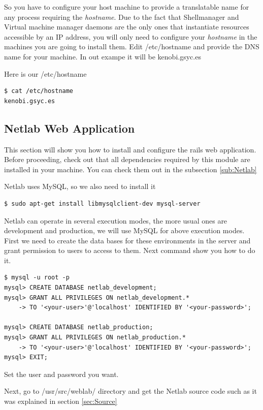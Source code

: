 \documentclass{article}
\begin{document}
So you have to configure your host machine to provide a translatable name for any process requiring the \textit{hostname}. Due to the fact that Shellmanager and Virtual machine manager daemons are the only ones that instantiate resources accessible by an IP address, you will only need to configure your \textit{hostname} in the machines you are going to install them. Edit /etc/hostname and provide the DNS name for your machine. In out exampe it will be kenobi.gsyc.es

Here is our /etc/hostname
\begin{verbatim}
$ cat /etc/hostname 
kenobi.gsyc.es
\end{verbatim}

\subsection{Netlab Web Application}
\label{sub:NetlabCFG}
This section will show you how to install and configure the rails web application. Before proceeding, check out that all dependencies required by this module are installed in your machine. You can check them out in the subsection \ref{sub:Netlab}

Netlab uses MySQL, so we also need to install it
\begin{verbatim}
$ sudo apt-get install libmysqlclient-dev mysql-server
\end{verbatim}

Netlab can operate in several execution modes, the more usual ones are development and production, we will use MySQL for above execution modes. First we need to create the data bases for these environments in the server and grant permission to users to access to them. Next command show you how to do it.

\begin{verbatim}
$ mysql -u root -p
mysql> CREATE DATABASE netlab_development;
mysql> GRANT ALL PRIVILEGES ON netlab_development.*
    -> TO '<your-user>'@'localhost' IDENTIFIED BY '<your-password>';

mysql> CREATE DATABASE netlab_production;
mysql> GRANT ALL PRIVILEGES ON netlab_production.*
    -> TO '<your-user>'@'localhost' IDENTIFIED BY '<your-password>';
mysql> EXIT;
\end{verbatim}

Set the user and password you want.

Next, go to /usr/src/weblab/ directory and get the Netlab source code such as it was explained in section \ref{sec:Source}
\end{document}
